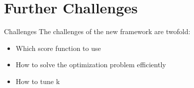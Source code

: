 \documentclass[xcolor=dvipsnames]{beamer}
\begin{document}
\section{Further Challenges}
\begin{frame}{Challenges}
The challenges of the new framework are twofold:\\
\begin{itemize}
\item Which score function to use\\
\item How to solve the optimization problem efficiently\\
\item How to tune k\\
\end{itemize}
\end{frame}
\end{document}
